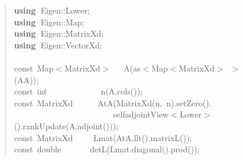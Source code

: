 \documentclass[shortnames,article]{jss}
\newcommand{\hlstd}[1]{\textcolor[rgb]{0,0,0}{#1}}
\newcommand{\hlopt}[1]{\textcolor[rgb]{0,0,0}{#1}}
\newcommand{\hlkwa}[1]{\textcolor[rgb]{0.61,0.13,0.93}{\bf{#1}}}
\newcommand{\hlkwb}[1]{\textcolor[rgb]{0.13,0.54,0.13}{#1}}
\newcommand{\hlkwd}[1]{\textcolor[rgb]{0,0,0}{#1}}
\begin{document}
\begin{figure}[htb]
  \begin{quote}
    \noindent
    \ttfamily
    \hlstd{}\hlkwa{using\ }\hlstd{Eigen}\hlopt{::}\hlstd{Lower}\hlopt{;}\hspace*{\fill}\\
    \hlstd{}\hlkwa{using\ }\hlstd{Eigen}\hlopt{::}\hlstd{Map}\hlopt{;}\hspace*{\fill}\\
    \hlstd{}\hlkwa{using\ }\hlstd{Eigen}\hlopt{::}\hlstd{MatrixXd}\hlopt{;}\hspace*{\fill}\\
    \hlstd{}\hlkwa{using\ }\hlstd{Eigen}\hlopt{::}\hlstd{VectorXd}\hlopt{;}\hspace*{\fill}\\
    \hlstd{}\hspace*{\fill}\\
    \hlkwb{const\ }\hlstd{Map}\hlopt{$<$}\hlstd{MatrixXd}\hlopt{$>$}\hlstd{\ \ \ }\hlopt{}\hlstd{}\hlkwd{A}\hlstd{}\hlopt{(}\hlstd{as}\hlopt{$<$}\hlstd{Map}\hlopt{$<$}\hlstd{MatrixXd}\hlopt{$>$\ $>$(}\hlstd{AA}\hlopt{));}\hspace*{\fill}\\
    \hlstd{}\hlkwb{const\ int}\hlstd{\ \ \ \ \ \ \ \ \ \ \ \ \ }\hlkwb{}\hlstd{}\hlkwd{n}\hlstd{}\hlopt{(}\hlstd{A}\hlopt{.}\hlstd{}\hlkwd{cols}\hlstd{}\hlopt{());}\hspace*{\fill}\\
    \hlstd{}\hlkwb{const\ }\hlstd{MatrixXd}\hlstd{\ \ \ \ \ \ }\hlstd{}\hlkwd{AtA}\hlstd{}\hlopt{(}\hlstd{}\hlkwd{MatrixXd}\hlstd{}\hlopt{(}\hlstd{n}\hlopt{,\ }\hlstd{n}\hlopt{).}\hlstd{}\hlkwd{setZero}\hlstd{}\hlopt{().}\hspace*{\fill}\\
    \hlstd{}\hlstd{\ \ \ \ \ \ \ \ \ \ \ \ \ \ \ \ \ \ \ \ \ \ \ \ }\hlstd{selfadjointView}\hlopt{$<$}\hlstd{Lower}\hlopt{$>$().}\hlstd{}\hlkwd{rankUpdate}\hlstd{}\hlopt{(}\hlstd{A}\hlopt{.}\hlstd{}\hlkwd{adjoint}\hlstd{}\hlopt{()));}\hspace*{\fill}\\
    \hlstd{}\hlkwb{const\ }\hlstd{MatrixXd}\hlstd{\ \ \ \ \ }\hlstd{}\hlkwd{Lmat}\hlstd{}\hlopt{(}\hlstd{AtA}\hlopt{.}\hlstd{}\hlkwd{llt}\hlstd{}\hlopt{().}\hlstd{}\hlkwd{matrixL}\hlstd{}\hlopt{());}\hspace*{\fill}\\
    \hlstd{}\hlkwb{const\ double}\hlstd{\ \ \ \ \ \ \ }\hlkwb{}\hlstd{}\hlkwd{detL}\hlstd{}\hlopt{(}\hlstd{Lmat}\hlopt{.}\hlstd{}\hlkwd{diagonal}\hlstd{}\hlopt{().}\hlstd{}\hlkwd{prod}\hlstd{}\hlopt{());}\hspace*{\fill}\\

\end{quote}
\end{figure}
\end{document}

